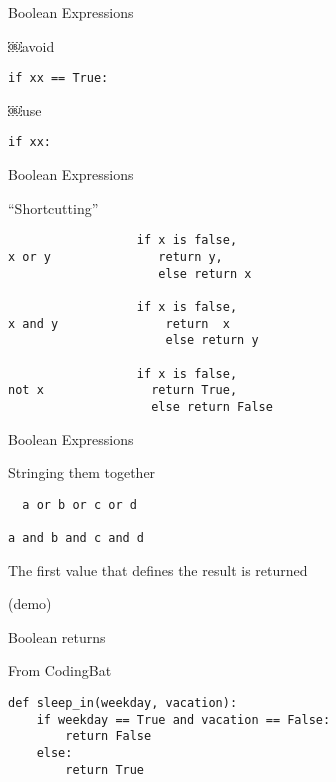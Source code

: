 \documentclass{beamer}
\begin{document}
\begin{frame}[fragile]{Boolean Expressions}

{ \Large￼avoid }

\vspace{0.25in}
\verb+if xx == True:+

\vspace{0.25in}
{ \Large￼use }

\vspace{0.25in}
\verb+if xx:+

\end{frame}

\begin{frame}[fragile]{Boolean Expressions}

{\Large ``Shortcutting''}

\begin{verbatim}
                  if x is false, 
x or y               return y,
                     else return x

                  if x is false,
x and y               return  x
                      else return y

                  if x is false,
not x               return True,
                    else return False 
\end{verbatim}

\end{frame} 

\begin{frame}[fragile]{Boolean Expressions}

{\Large Stringing them together}

\begin{verbatim}
￼ a or b or c or d

a and b and c and d  
\end{verbatim}

{\Large The first value that defines the result is returned}

\vfill
(demo)
\end{frame}


\begin{frame}[fragile]{Boolean returns}

{\Large From CodingBat}
\vfill
\begin{verbatim}
def sleep_in(weekday, vacation):
    if weekday == True and vacation == False:
        return False
    else:
        return True
\end{verbatim}

\end{frame}
\end{document}
